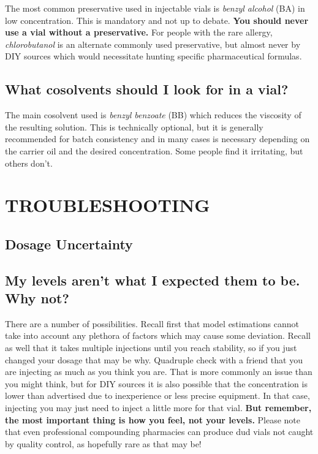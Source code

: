 \documentclass{article}
\begin{document}
The most common preservative used in injectable vials is \textit{benzyl alcohol} (BA) in low concentration. This is mandatory and not up to debate. \textbf{You should never use a vial without a preservative.} For people with the rare allergy, \textit{chlorobutanol} is an alternate commonly used preservative, but almost never by DIY sources which would necessitate hunting specific pharmaceutical formulas.

\subsection{What cosolvents should I look for in a vial?}

The main cosolvent used is \textit{benzyl benzoate} (BB) which reduces the viscosity of the resulting solution. This is technically optional, but it is generally recommended for batch consistency and in many cases is necessary depending on the carrier oil and the desired concentration. Some people find it irritating, but others don’t.


\section{TROUBLESHOOTING}

\subsection*{Dosage Uncertainty}

\subsection{My levels aren’t what I expected them to be. Why not?}

There are a number of possibilities. Recall first that model estimations cannot take into account any plethora of factors which may cause some deviation. Recall as well that it takes multiple injections until you reach stability, so if you just changed your dosage that may be why. Quadruple check with a friend that you are injecting as much as you think you are. That is more commonly an issue than you might think, but for DIY sources it is also possible that the concentration is lower than advertised due to inexperience or less precise equipment. In that case, injecting you may just need to inject a little more for that vial. \textbf{But remember, the most important thing is how you feel, not your levels.} Please note that even professional compounding pharmacies can produce dud vials not caught by quality control, as hopefully rare as that may be!
\end{document}
